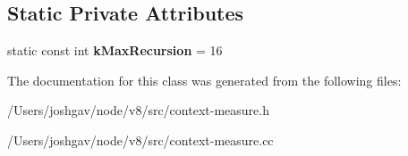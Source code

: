 \subsection*{Static Private Attributes}
\begin{DoxyCompactItemize}
\item 
static const int {\bfseries k\+Max\+Recursion} = 16\hypertarget{classv8_1_1internal_1_1_context_measure_a88ce6c01c49bbdf1c80ef22414935af2}{}\label{classv8_1_1internal_1_1_context_measure_a88ce6c01c49bbdf1c80ef22414935af2}

\end{DoxyCompactItemize}


The documentation for this class was generated from the following files\+:\begin{DoxyCompactItemize}
\item 
/\+Users/joshgav/node/v8/src/context-\/measure.\+h\item 
/\+Users/joshgav/node/v8/src/context-\/measure.\+cc\end{DoxyCompactItemize}
